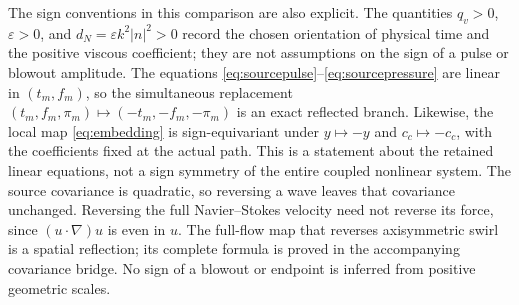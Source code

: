 The sign conventions in this comparison are also explicit.  The quantities
$q_v>0$, $\varepsilon>0$, and $d_N=\varepsilon k^2|n|^2>0$ record the chosen
orientation of physical time and the positive viscous coefficient; they are
not assumptions on the sign of a pulse or blowout amplitude.  The equations
\eqref{eq:sourcepulse}--\eqref{eq:sourcepressure} are linear in $(t_m,f_m)$,
so the simultaneous replacement $(t_m,f_m,\pi_m)\mapsto
(-t_m,-f_m,-\pi_m)$ is an exact reflected branch.  Likewise, the local map
\eqref{eq:embedding} is sign-equivariant under $y\mapsto-y$ and
$c_c\mapsto-c_c$, with the coefficients fixed at the actual path.
This is a statement about the retained linear equations, not a sign symmetry
of the entire coupled nonlinear system.
The source covariance is quadratic, so reversing a wave leaves that
covariance unchanged. Reversing the full Navier--Stokes velocity need not
reverse its force, since $(u\cdot\nabla)u$ is even in $u$.
The full-flow map that reverses axisymmetric swirl is a spatial reflection;
its complete formula is proved in the accompanying covariance bridge.
No sign of a blowout or endpoint is inferred from positive geometric scales.
